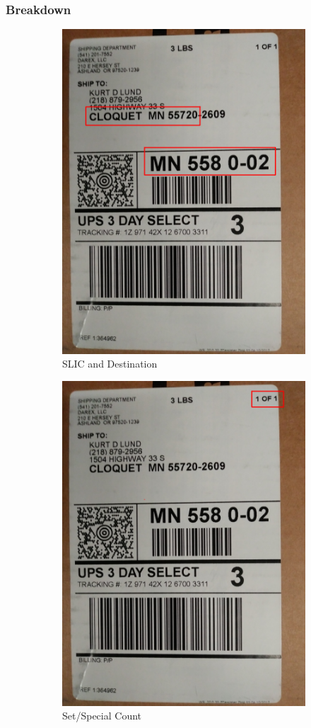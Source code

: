 \documentclass[12pt]{article}
\begin{document}
\subsubsection{Breakdown}

\begin{figure}[H]
\begin{subfigure}{0.5\textwidth}
\centering
\includegraphics[width=0.5\linewidth]{20171221_161952_slic} 
\caption{SLIC and Destination}
\end{subfigure}
\begin{subfigure}{0.5\textwidth}
\centering
\includegraphics[width=0.5\linewidth]{20171221_161952_set}
\caption{Set/Special Count}
\end{subfigure}
\vspace{5mm}
\begin{subfigure}{0.5\textwidth}
\centering

\end{subfigure}
\end{figure}
\end{document}
